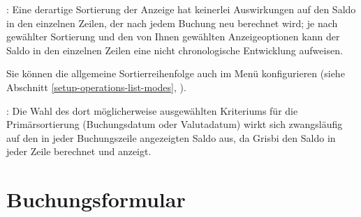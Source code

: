 \Note{}: Eine derartige Sortierung der Anzeige hat keinerlei Auswirkungen auf den Saldo in den einzelnen Zeilen, der nach jedem Buchung neu berechnet wird; je nach gewählter Sortierung und den von Ihnen gewählten Anzeigeoptionen kann der Saldo in den einzelnen Zeilen eine nicht chronologische Entwicklung aufweisen.

Sie können die allgemeine Sortierreihenfolge auch im Menü  konfigurieren (siehe Abschnitt \vref{setup-operations-list-modes}, ).

\Note{}: Die Wahl des dort möglicherweise ausgewählten Kriteriums für die \gls{Primärsortierung} (Buchungsdatum oder Valutadatum) wirkt sich zwangsläufig auf den in jeder Buchungszeile angezeigten Saldo aus, da Grisbi den Saldo in jeder Zeile berechnet und anzeigt.


\section{Buchungsformular\label{transactions-form}}

